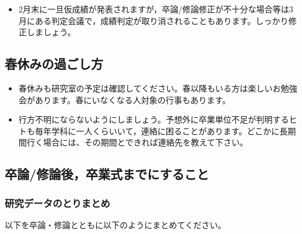 \documentclass[11pt, ]{jsarticle}
\providecommand{\tightlist}{%
   \setlength{\itemsep}{0pt}\setlength{\parskip}{0pt}}
\begin{document}
\begin{itemize}
\tightlist
\item
  2月末に一旦仮成績が発表されますが，卒論/修論修正が不十分な場合等は3月にある判定会議で，成績判定が取り消されることもあります。しっかり修正しましょう。
\end{itemize}

\hypertarget{ux6625ux4f11ux307fux306eux904eux3054ux3057ux65b9}{%
\subsection{春休みの過ごし方}\label{ux6625ux4f11ux307fux306eux904eux3054ux3057ux65b9}}

\begin{itemize}
\tightlist
\item
  春休みも研究室の予定は確認してください。春以降もいる方は楽しいお勉強会があります。春にいなくなる人対象の行事もあります。
\item
  行方不明にならないようにしましょう。予想外に卒業単位不足が判明するヒトも毎年学科に一人くらいいて，連絡に困ることがあります。どこかに長期間行く場合には、その期間とできれば連絡先を教えて下さい。
\end{itemize}

\hypertarget{ux5352ux8ad6ux4feeux8ad6ux5f8cux5352ux696dux5f0fux307eux3067ux306bux3059ux308bux3053ux3068}{%
\subsection{卒論/修論後，卒業式までにすること}\label{ux5352ux8ad6ux4feeux8ad6ux5f8cux5352ux696dux5f0fux307eux3067ux306bux3059ux308bux3053ux3068}}

\hypertarget{ux7814ux7a76ux30c7ux30fcux30bfux306eux3068ux308aux307eux3068ux3081}{%
\subsubsection{研究データのとりまとめ}\label{ux7814ux7a76ux30c7ux30fcux30bfux306eux3068ux308aux307eux3068ux3081}}

以下を卒論・修論とともに以下のようにまとめてください。
\end{document}
